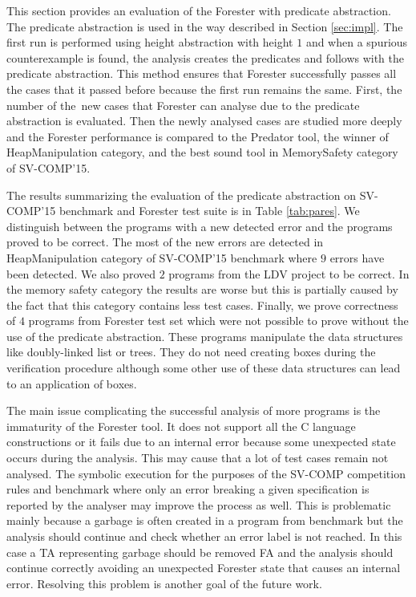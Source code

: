 This section provides an evaluation of the Forester with predicate abstraction.
The predicate abstraction is used in the way described in Section \ref{sec:impl}.
The first run is performed using height abstraction with height $1$ and when a spurious
counterexample is found, the analysis creates the predicates and follows with
the predicate abstraction.
This method ensures that Forester successfully passes all the cases that it passed
before because the first run remains the same.
First, the number of the~new cases that Forester can analyse due to
the predicate abstraction is evaluated.
Then the newly analysed cases are studied more deeply and
the Forester performance is compared to the Predator tool, the winner of HeapManipulation category,
and the best sound tool in MemorySafety category of SV-COMP'15.

The results summarizing the evaluation of the predicate abstraction on SV-COMP'15
benchmark and Forester test suite is in Table \ref{tab:pares}.
We distinguish between the programs with a new detected error
and the programs proved to be correct.
The most of the new errors are detected in HeapManipulation category of SV-COMP'15
benchmark where $9$ errors have been detected.
We also proved $2$ programs from the LDV project to be correct.
In the memory safety category the results are worse but this is partially caused
by the fact that this category contains less test cases.
Finally, we prove correctness of $4$ programs from Forester test set
which were not possible to prove without the use of the predicate abstraction.
These programs manipulate the data structures like doubly-linked list
or trees.
They do not need creating boxes during the verification procedure although
some other use of these data structures can lead to an application of boxes.

The main issue complicating the successful analysis of
more programs is the immaturity of the Forester tool.
It does not support all the C language constructions
or it fails due to an internal error because some unexpected
state occurs during the analysis.
This may cause that a lot of test cases remain not analysed.
The symbolic execution for the purposes of the SV-COMP competition rules and benchmark
where only an error breaking a given specification is reported
by the analyser may improve the process as well.
This is problematic mainly because a garbage is often created
in a program from benchmark but the analysis should continue
and check whether an error label is not reached.
In this case a TA representing garbage should be removed FA
and the analysis should continue correctly avoiding
an unexpected Forester state that causes an internal error.
Resolving this problem is another goal of the future work.

